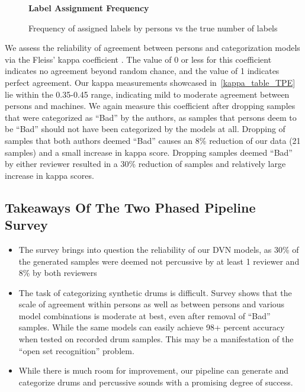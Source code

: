 \documentclass[\main/thesis.tex]{subfiles}
\begin{document}
\begin{figure}[h!]
    \begin{center}
    \textbf{Label Assignment Frequency}
    \end{center}
    \caption{Frequency of assigned labels by persons vs the true number of labels}
\label{fig:freq-survey-2p}
\end{figure}
We assess the reliability of agreement between persons and categorization models via the Fleiss' kappa coefficient \cite{fleiss1971measuring}. The value of 0 or less for this coefficient indicates no agreement beyond random chance, and the value of 1 indicates perfect agreement. Our kappa measurements showcased in~\ref{kappa_table_TPE} lie within the 0.35-0.45 range, indicating mild to moderate agreement between persons and machines. We again measure this coefficient after dropping samples that were categorized as \enquote{Bad} by the authors, as samples that persons deem to be \enquote{Bad} should not have been categorized by the models at all. Dropping of samples that both authors deemed \enquote{Bad} causes an 8\% reduction of our data (21 samples) and a small increase in kappa score. Dropping samples deemed \enquote{Bad} by either reviewer resulted in a 30\% reduction of samples and relatively large increase in kappa scores. 

\subsection{Takeaways Of The Two Phased Pipeline Survey}
\label{survey1_takeaway}
\begin{itemize}
    \item The survey brings into question the reliability of our DVN models, as 30\% of the generated samples were deemed not percussive by at least 1 reviewer and 8\% by both reviewers
    \item The task of categorizing synthetic drums is difficult. Survey shows that the scale of agreement within persons as well as between persons and various model combinations is moderate at best, even after removal of \enquote{Bad} samples.  While the same models can easily achieve 98+ percent accuracy when tested on recorded drum samples. This may be a manifestation of the \enquote{open set recognition} problem. 
    \item While there is much room for improvement, our pipeline can generate and categorize drums and percussive sounds with a promising degree of success. 
\end{itemize}
\end{document}

